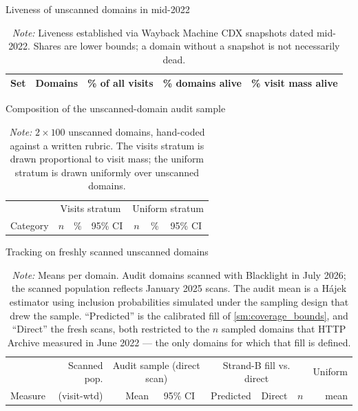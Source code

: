 \documentclass[12pt, letterpaper]{article}
\begin{document}
\begin{table}[ht]
\centering
\caption{Liveness of unscanned domains in mid-2022}
\label{tab:wb_liveness}
\begin{adjustbox}{max width=\textwidth}
\begin{tabular}{lrrrr}
\toprule
Set & Domains & \% of all visits & \% domains alive & \% visit mass alive \\
\midrule

\bottomrule
\end{tabular}
\end{adjustbox}
\caption*{\textit{Note:} Liveness established via Wayback Machine CDX snapshots dated mid-2022. Shares are lower bounds; a domain without a snapshot is not necessarily dead.}
\end{table}

\begin{table}[ht]
\centering
\caption{Composition of the unscanned-domain audit sample}
\label{tab:selection_audit_composition}
\begin{adjustbox}{max width=\textwidth}
\begin{tabular}{lrrcrrc}
\toprule
& \multicolumn{3}{c}{Visits stratum} & \multicolumn{3}{c}{Uniform stratum} \\
\cmidrule(lr){2-4}\cmidrule(lr){5-7}
Category & $n$ & \% & 95\% CI & $n$ & \% & 95\% CI \\
\midrule

\bottomrule
\end{tabular}
\end{adjustbox}
\caption*{\textit{Note:} $2 \times 100$ unscanned domains, hand-coded against a written rubric. The visits stratum is drawn proportional to visit mass; the uniform stratum is drawn uniformly over unscanned domains.}
\end{table}

\begin{table}[ht]
\centering
\caption{Tracking on freshly scanned unscanned domains}
\label{tab:selection_audit_tracking}
\begin{adjustbox}{max width=\textwidth}
\begin{tabular}{lrrcrrrr}
\toprule
& Scanned pop. & \multicolumn{2}{c}{Audit sample (direct scan)} & \multicolumn{3}{c}{Strand-B fill vs. direct} & Uniform \\
\cmidrule(lr){3-4} \cmidrule(lr){5-7}
Measure & (visit-wtd) & Mean & 95\% CI & Predicted & Direct & $n$ & mean \\
\midrule

\bottomrule
\end{tabular}
\end{adjustbox}
\caption*{\textit{Note:} Means per domain. Audit domains scanned with Blacklight in July 2026; the scanned population reflects January 2025 scans. The audit mean is a H\'ajek estimator using inclusion probabilities simulated under the sampling design that drew the sample. ``Predicted'' is the calibrated fill of \cref{sm:coverage_bounds}, and ``Direct'' the fresh scans, both restricted to the $n$ sampled domains that HTTP Archive measured in June 2022 --- the only domains for which that fill is defined.}
\end{table}
\end{document}
